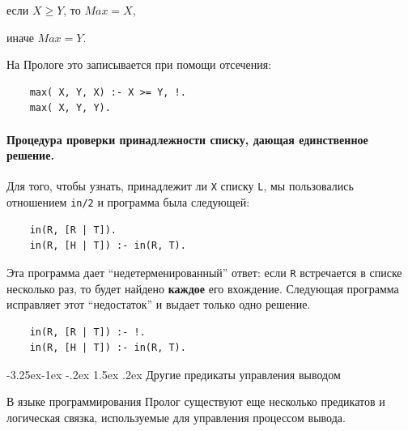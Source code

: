\documentclass[12pt, openany, twoside]{book} %
\makeatletter
\renewcommand\subsection{\@startsection{subsection}{2}{\z@}%
                                     {-3.25ex\@plus -1ex \@minus -.2ex}%
                                     {1.5ex \@plus .2ex}%
                                     {\normalfont\normalsize\bfseries}}
\makeatother
\begin{document}
если $X \geq Y$, то $Max = X$,

иначе $Max = Y$.

На Прологе это записывается при помощи отсечения:
{\tt \begin{verbatim}
    max( X, Y, X) :- X >= Y, !.
    max( X, Y, Y).
\end{verbatim}}

\paragraph{Процедура проверки принадлежности списку, дающая единственное
решение.} Для того, чтобы узнать, принадлежит ли {\tt X} списку {\tt L}, мы пользовались отношением {\tt in/2} и программа была следующей:
{\tt \begin{verbatim}
    in(R, [R | Т]).
    in(R, [H | Т]) :- in(R, T).
\end{verbatim}}

\noindent Эта программа дает ``недетерменированный'' ответ: если {\tt R} встречается в списке несколько раз, то будет найдено {\bf каждое} его вхождение. Следующая программа исправляет этот ``недостаток'' и выдает только одно решение.
{\tt \begin{verbatim}
    in(R, [R | Т]) :- !.
    in(R, [H | Т]) :- in(R, T).
\end{verbatim}}

\subsection{Другие предикаты управления выводом}

В языке программирования Пролог существуют еще несколько предикатов и логическая связка, используемые для управления процессом вывода.
\end{document}
